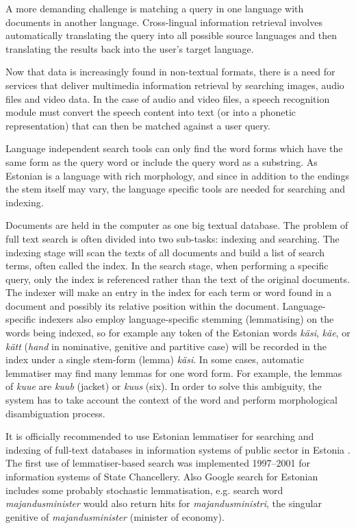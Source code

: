 \begin{multicols}{2}
A more demanding challenge is matching a query in one language with documents in another language. Cross-lingual information retrieval involves automatically translating the query into all possible source languages and then translating the results back into the user's target language.

Now that data is increasingly found in non-textual formats, there is a need for services that deliver multimedia information retrieval by searching images, audio files and video data. In the case of audio and video files, a speech recognition module must convert the speech content into text (or into a phonetic representation) that can then be matched against a user query.

Language independent search tools can only find the word forms which have the same form as the query word or include the query word as a substring. 
As Estonian is a language with rich morphology, and since in addition to the endings the stem itself may vary, the language specific tools are needed for searching and indexing. 

Documents are held in the computer as one big textual database. 
The problem of full text search is often divided into two sub-tasks: indexing and searching. 
The indexing stage will scan the texts of all documents and build a list of search terms, often called the index.
In the search stage, when performing a specific query, only the index is referenced rather than the text of the original documents.
The indexer will make an entry in the index for each term or word found in a document and possibly its relative position within the document. 
Language-specific indexers also employ language-specific stemming (lemmatising) on the words being indexed, so for example any token of the Estonian words \textit{käsi}, \textit{käe}, or \textit{kätt} (\textit{hand} in nominative, genitive and partitive case) will be recorded in the index under a single stem-form (lemma) \textit{käsi}.
In some cases, automatic lemmatiser may find many lemmas for one word form. 
For example, the lemmas of \textit{kuue} are \textit{kuub} (jacket) or \textit{kuus} (six). 
In order to solve this ambiguity, the system has to take account the context of the word and perform morphological disambiguation process.
 
It is officially recommended to use Estonian lemmatiser for searching and indexing of full-text databases in information systems of public sector in Estonia \cite{RIA}.
The first use of lemmatiser-based search was implemented 1997--2001 for information systems of State Chancellery.
Also Google search for Estonian includes some probably stochastic lemmatisation, e.g. search word \textit{majandusminister} would also return hits for \textit{majandusministri}, the singular genitive of \textit{majandusminister} (minister of economy).


\end{multicols}
